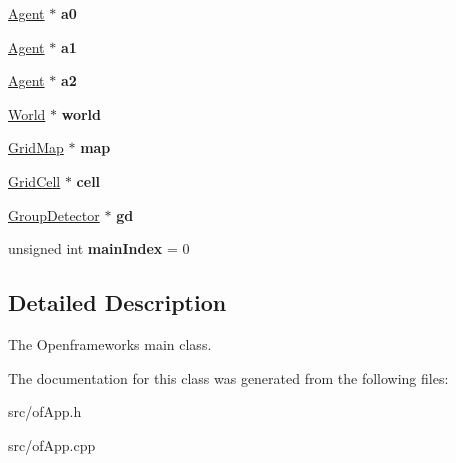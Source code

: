 \begin{DoxyCompactItemize}
\item 
\hyperlink{classAgent}{Agent} $\ast$ {\bfseries a0}\hypertarget{classofApp_ae100ffeb10bd7439d24bf606365956e5}{}\label{classofApp_ae100ffeb10bd7439d24bf606365956e5}

\item 
\hyperlink{classAgent}{Agent} $\ast$ {\bfseries a1}\hypertarget{classofApp_a703e5942a48c36efe1dad9450e042e63}{}\label{classofApp_a703e5942a48c36efe1dad9450e042e63}

\item 
\hyperlink{classAgent}{Agent} $\ast$ {\bfseries a2}\hypertarget{classofApp_a864b2722b7f32dd2c66c6a90cab066be}{}\label{classofApp_a864b2722b7f32dd2c66c6a90cab066be}

\item 
\hyperlink{classWorld}{World} $\ast$ {\bfseries world}\hypertarget{classofApp_ae146b318602cd5a1abddf5778915b369}{}\label{classofApp_ae146b318602cd5a1abddf5778915b369}

\item 
\hyperlink{classGridMap}{Grid\+Map} $\ast$ {\bfseries map}\hypertarget{classofApp_a6daaa3248f63f2da9e7373cce146d171}{}\label{classofApp_a6daaa3248f63f2da9e7373cce146d171}

\item 
\hyperlink{classGridCell}{Grid\+Cell} $\ast$ {\bfseries cell}\hypertarget{classofApp_a9bab726e0a2bc63c048fd3be1609df43}{}\label{classofApp_a9bab726e0a2bc63c048fd3be1609df43}

\item 
\hyperlink{classGroupDetector}{Group\+Detector} $\ast$ {\bfseries gd}\hypertarget{classofApp_a515911af87b24f2949c9eaf4266345c3}{}\label{classofApp_a515911af87b24f2949c9eaf4266345c3}

\item 
unsigned int {\bfseries main\+Index} = 0\hypertarget{classofApp_a8d05d08ac147194bc7b3dc488c99d5a3}{}\label{classofApp_a8d05d08ac147194bc7b3dc488c99d5a3}

\end{DoxyCompactItemize}


\subsection{Detailed Description}
The Openframeworks main class. 

The documentation for this class was generated from the following files\+:\begin{DoxyCompactItemize}
\item 
src/of\+App.\+h\item 
src/of\+App.\+cpp\end{DoxyCompactItemize}
